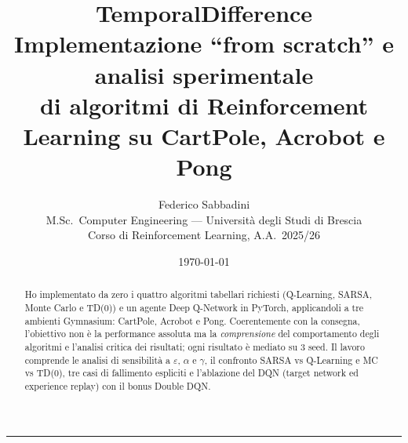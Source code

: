 \documentclass[11pt,a4paper]{article}
\title{\textbf{TemporalDifference}\\[0.35em]
       \large Implementazione ``from scratch'' e analisi sperimentale\\
       di algoritmi di Reinforcement Learning su CartPole, Acrobot e Pong}
\author{Federico Sabbadini\\
        \small M.Sc.\ Computer Engineering --- Universit\`a degli Studi di Brescia\\
        \small Corso di Reinforcement Learning, A.A.\ 2025/26}
\date{\today}
\begin{document}
\maketitle

\begin{abstract}
\noindent
Ho implementato da zero i quattro algoritmi tabellari richiesti (Q\hbox{-}Learning,
SARSA, Monte Carlo e TD(0)) e un agente Deep Q\hbox{-}Network in PyTorch, applicandoli
a tre ambienti Gymnasium: CartPole, Acrobot e Pong. Coerentemente con la consegna,
l'obiettivo non \`e la performance assoluta ma la \emph{comprensione} del comportamento
degli algoritmi e l'analisi critica dei risultati; ogni risultato \`e mediato su 3 seed.
Il lavoro comprende le analisi di sensibilit\`a a $\varepsilon$, $\alpha$ e $\gamma$, il
confronto SARSA vs Q\hbox{-}Learning e MC vs TD(0), tre casi di fallimento espliciti e
l'ablazione del DQN (target network ed experience replay) con il bonus Double DQN.
\end{abstract}

\medskip\hrule\medskip


\clearpage

\clearpage

\clearpage

\clearpage

\clearpage

\clearpage

\clearpage

\end{document}
